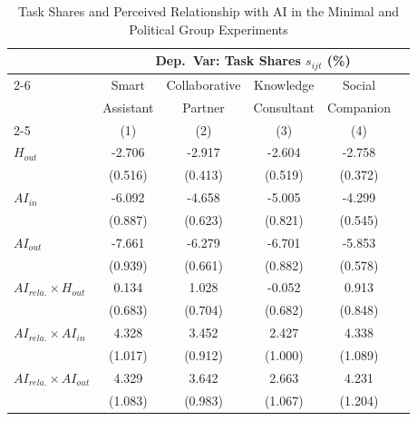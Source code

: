 \begin{table}[htbp]
\centering
\caption{Task Shares and Perceived Relationship with AI in the Minimal and Political Group Experiments}
\label{tab:ai_relation}
\scriptsize
\begin{threeparttable}
\begin{tabular}{l*{5}{c}}
\toprule\toprule
 & \multicolumn{5}{c}{Dep.\ Var: Task Shares $s_{ijt}$ (\%)} \\
\cmidrule(lr){2-6}
 & Smart & Collaborative & Knowledge & Social & \\
 & Assistant & Partner & Consultant & Companion & \\
\cmidrule(lr){2-5}
 & (1) & (2) & (3) & (4) & \\
\midrule
\midrule
$H_{out}$   &      -2.706\sym{***}&      -2.917\sym{***}&      -2.604\sym{***}&      -2.758\sym{***}\\
            &     (0.516)         &     (0.413)         &     (0.519)         &     (0.372)         \\
\addlinespace
$AI_{in}$   &      -6.092\sym{***}&      -4.658\sym{***}&      -5.005\sym{***}&      -4.299\sym{***}\\
            &     (0.887)         &     (0.623)         &     (0.821)         &     (0.545)         \\
\addlinespace
$AI_{out}$  &      -7.661\sym{***}&      -6.279\sym{***}&      -6.701\sym{***}&      -5.853\sym{***}\\
            &     (0.939)         &     (0.661)         &     (0.882)         &     (0.578)         \\
\addlinespace
$AI_{rela.} \times H_{out}$&       0.134         &       1.028         &      -0.052         &       0.913         \\
            &     (0.683)         &     (0.704)         &     (0.682)         &     (0.848)         \\
\addlinespace
$AI_{rela.} \times AI_{in}$&       4.328\sym{***}&       3.452\sym{***}&       2.427\sym{**} &       4.338\sym{***}\\
            &     (1.017)         &     (0.912)         &     (1.000)         &     (1.089)         \\
\addlinespace
$AI_{rela.} \times AI_{out}$&       4.329\sym{***}&       3.642\sym{***}&       2.663\sym{**} &       4.231\sym{***}\\
            &     (1.083)         &     (0.983)         &     (1.067)         &     (1.204)         \\

\end{tabular}
\end{threeparttable}
\end{table}
